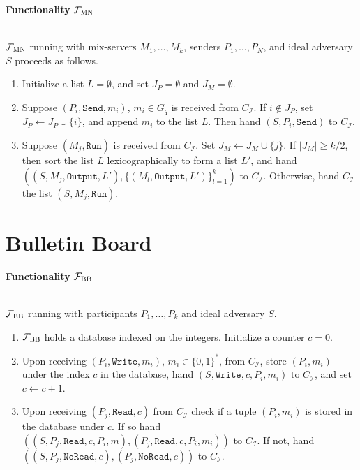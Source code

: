 \documentclass[a4paper]{article}
\newcommand{\F}{\mathcal{F}}
\begin{document}
\begin{framed}
    \centerline{\textbf{Functionality} $\F_{\textsc{MN}}$}
    \ \\
    \noindent $\F_{\textsc{MN}}$ running with mix-servers $M_1, \ldots, M_k$, senders $P_1, \ldots, P_N$, and ideal adversary $S$ proceeds as follows.
    
    \begin{enumerate}
        \item Initialize a list $L = \emptyset$, and set $J_P = \emptyset$ and $J_M = \emptyset$.
        \item Suppose $(P_i, \texttt{Send}, m_i)$, $m_i \in G_q$ is received from $C_\mathcal{I}$. If $i \not \in J_P$, set $J_P \leftarrow J_P \cup \{i\}$, and append $m_i$ to the list $L$. Then hand $(S, P_i, \texttt{Send})$ to $C_\mathcal{I}$.
        \item Suppose $(M_j, \texttt{Run})$ is received from $C_\mathcal{I}$. Set $J_M \leftarrow J_M \cup \{j\}$. If $|J_M| \geq k/2$, then sort the list $L$ lexicographically to form a list $L'$, and hand $((S, M_j, \texttt{Output}, L'), {\{(M_l, \texttt{Output}, L')\}}^{k}_{l=1})$ to $C_\mathcal{I}$. Otherwise, hand $C_\mathcal{I}$ the list $(S, M_j, \texttt{Run})$.
    \end{enumerate}
\end{framed}



\section{Bulletin Board~\cite{wikstrom2004universally}}

\begin{framed}
    \centerline{\textbf{Functionality} $\F_{\textsc{BB}}$}
    \ \\
    \noindent $\F_{\textsc{BB}}$ running with participants $P_1, \ldots, P_k$ and ideal adversary $S$.
    
    \begin{enumerate}
        \item $\F_{\textsc{BB}}$ holds a database indexed on the integers. Initialize a counter $c = 0$.
        \item Upon receiving $(P_i, \texttt{Write}, m_i)$, $m_i \in {\{0, 1\}}^*$, from $C_\mathcal{I}$, store $(P_i, m_i)$ under the index $c$ in the database, hand $(S, \texttt{Write}, c, P_i, m_i)$ to $C_\mathcal{I}$, and set $c \leftarrow c + 1$.
        \item Upon receiving $(P_j, \texttt{Read}, c)$ from $C_\mathcal{I}$ check if a tuple $(P_i, m_i)$ is stored in the database under $c$. If so hand $((S, P_j, \texttt{Read}, c, P_i, m),(P_j, \texttt{Read}, c, P_i, m_i))$ to $C_\mathcal{I}$. If not, hand $((S, P_j, \texttt{NoRead},c), (P_j, \texttt{NoRead}, c))$ to $C_\mathcal{I}$.
    \end{enumerate}
\end{framed}
\end{document}
